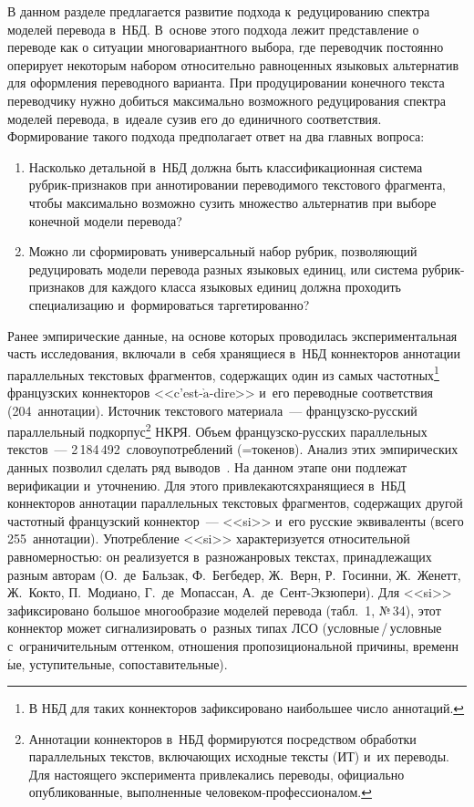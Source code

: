 \begin{multicols}{2}
  В данном разделе предлагается развитие подхода к~редуцированию спектра 
моделей перевода в~НБД. В~основе этого подхода лежит представление о 
переводе как о ситуации многовариантного выбора, где переводчик 
постоянно оперирует некоторым набором относительно равноценных 
языковых альтернатив для оформления переводного варианта. При 
продуцировании конечного текста переводчику нужно добиться максимально 
возможного редуцирования спектра моделей перевода, в~идеале сузив его до 
единичного соответствия. Формирование такого подхода предполагает ответ 
на два главных вопроса:
  \begin{enumerate}[1.]
  \item Насколько детальной в~НБД должна быть классификационная 
система рубрик-признаков при аннотировании переводимого текстового 
фрагмента, чтобы максимально возможно сузить множество альтернатив при 
выборе конечной модели перевода?
  \item Можно ли сформировать универсальный набор рубрик, позволяющий 
редуцировать модели перевода разных языковых единиц, или система 
руб\-рик-при\-зна\-ков для каждого класса языковых единиц должна проходить 
специализацию и~формироваться таргетированно?
  \end{enumerate}
  
Ранее эмпирические данные, на основе которых проводилась 
экспериментальная часть исследования, включали в~себя хранящиеся в~НБД 
коннекторов аннотации параллельных текстовых \mbox{фрагментов}, содержащих 
один из самых частотных\footnote{В НБД для таких коннекторов зафиксировано наибольшее 
число аннотаций.} французских коннекторов <<c'est-$\grave{\mbox{a}}$-dire>> и~его 
переводные соответствия (204~аннотации). Источник текстового  
материала~--- фран\-цуз\-ско-рус\-ский параллельный 
подкорпус\footnote{Аннотации коннекторов в~НБД формируются посредством обработки 
параллельных текстов, включающих исходные текс\-ты (ИТ) и~их переводы. Для настоящего эксперимента 
привлекались переводы, официально опубликованные, выполненные 
 че\-ло\-ве\-ком-про\-фес\-си\-о\-на\-лом.} НКРЯ. Объем фран\-цуз\-ско-рус\-ских 
параллельных текстов~--- 2\,184\,492~словоупотреблений (=\;то\-ке\-нов). 
Анализ этих эмпирических данных позволил сделать ряд 
выводов~\cite[с.~122--123]{19-n}. На данном этапе они подлежат 
верификации и~уточнению. Для этого привлекаются\linebreak хранящиеся в~НБД 
коннекторов аннотации параллельных текстовых фрагментов, содержащих 
другой частотный французский коннектор~--- <<si>> и~его русские 
эквиваленты (всего 255~аннотации). \mbox{Употребление} <<si>> характеризуется 
относительной равномерностью: он реализуется в~разножанровых текстах, 
принадлежащих разным авторам (О.~де~Баль\-зак, Ф.~Бегбедер, Ж.~Верн, 
Р.~Госинни, Ж.~Женетт, Ж.~Кокто, П.~Модиано, Г.~де~Мо\-пас\-сан, 
А.~де~Сент-Эк\-зю\-пе\-ри). Для <<si>> зафиксировано большое 
многообразие моделей перевода (табл.~1, №\,34), этот коннектор может 
сигнализировать о~разных типах ЛСО (услов\-ные\,/\,услов\-ные 
с~ограничительным оттенком, отношения пропозициональной причины, 
временн$\acute{\mbox{ы}}$е, уступительные, сопоставительные).


\end{multicols}
